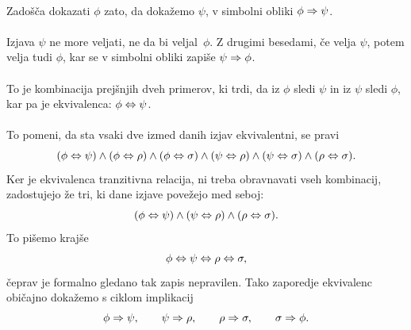 \paragraph{}
%
Zadošča dokazati $\phi$ zato, da dokažemo $\psi$, v simbolni obliki $\phi \Rightarrow \psi$.

\paragraph{}
%
Izjava $\psi$ ne more veljati, ne da bi veljal~$\phi$. Z drugimi
besedami, če velja $\psi$, potem velja tudi $\phi$, kar se v simbolni obliki
zapiše $\psi \Rightarrow \phi$.

\paragraph{}
%
To je kombinacija prejšnjih dveh primerov, ki trdi, da iz $\phi$ sledi
$\psi$ in iz $\psi$ sledi $\phi$, kar pa je ekvivalenca:
%
$\phi \Leftrightarrow \psi$.

\paragraph{}
%
To pomeni, da sta vsaki dve izmed danih izjav ekvivalentni, se pravi
%
\begin{equation*}
  (\phi \Leftrightarrow \psi) \land (\phi \Leftrightarrow \rho) \land (\phi \Leftrightarrow \sigma) \land (\psi \Leftrightarrow \rho)
  \land (\psi \Leftrightarrow \sigma) \land (\rho \Leftrightarrow \sigma).
\end{equation*}
%
Ker je ekvivalenca tranzitivna relacija, ni treba obravnavati vseh
kombinacij, zadostujejo že tri, ki dane izjave povežejo med seboj:
%
\begin{equation*}
  (\phi \Leftrightarrow \psi) \land (\psi \Leftrightarrow \rho) \land (\rho \Leftrightarrow \sigma).
\end{equation*}
%
To pišemo krajše
%
\begin{equation*}
  \phi \Leftrightarrow \psi \Leftrightarrow \rho \Leftrightarrow \sigma,
\end{equation*}
%
čeprav je formalno gledano tak zapis nepravilen. Tako zaporedje
ekvivalenc običajno dokažemo s ciklom implikacij
%
\begin{equation*}
\phi \Rightarrow \psi, \qquad
\psi \Rightarrow \rho, \qquad
\rho \Rightarrow \sigma, \qquad
\sigma \Rightarrow \phi.
\end{equation*}


